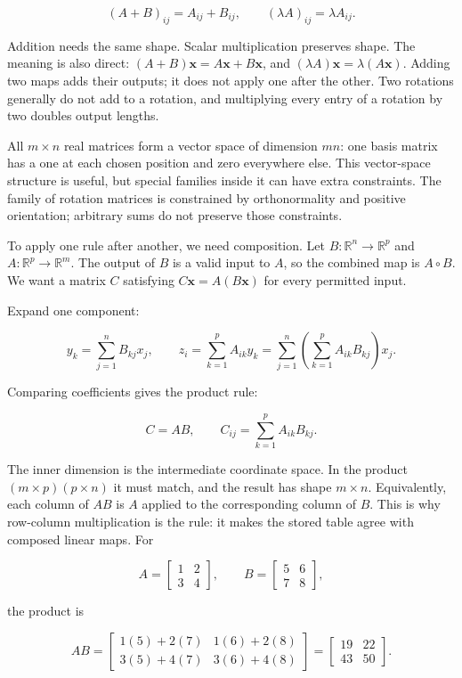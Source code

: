 \[
(A+B)_{ij}=A_{ij}+B_{ij},\qquad
(\lambda A)_{ij}=\lambda A_{ij}.
\]

Addition needs the same shape. Scalar multiplication preserves shape. The meaning is also direct: \((A+B)\mathbf x=A\mathbf x+B\mathbf x\), and \((\lambda A)\mathbf x=\lambda(A\mathbf x)\). Adding two maps adds their outputs; it does not apply one after the other. Two rotations generally do not add to a rotation, and multiplying every entry of a rotation by two doubles output lengths.

All \(m\times n\) real matrices form a vector space of dimension \(mn\): one basis matrix has a one at each chosen position and zero everywhere else. This vector-space structure is useful, but special families inside it can have extra constraints. The family of rotation matrices is constrained by orthonormality and positive orientation; arbitrary sums do not preserve those constraints.

To apply one rule after another, we need composition. Let \(B:\mathbb R^n\to\mathbb R^p\) and \(A:\mathbb R^p\to\mathbb R^m\). The output of \(B\) is a valid input to \(A\), so the combined map is \(A\circ B\). We want a matrix \(C\) satisfying \(C\mathbf x=A(B\mathbf x)\) for every permitted input.

Expand one component:

\[
y_k=\sum_{j=1}^{n}B_{kj}x_j,
\qquad
z_i=\sum_{k=1}^{p}A_{ik}y_k
=\sum_{j=1}^{n}\left(\sum_{k=1}^{p}A_{ik}B_{kj}\right)x_j.
\]

Comparing coefficients gives the product rule:

\[
C=AB,\qquad C_{ij}=\sum_{k=1}^{p}A_{ik}B_{kj}.
\]

The inner dimension is the intermediate coordinate space. In the product \((m\times p)(p\times n)\) it must match, and the result has shape \(m\times n\). Equivalently, each column of \(AB\) is \(A\) applied to the corresponding column of \(B\). This is why row-column multiplication is the rule: it makes the stored table agree with composed linear maps. For

\[
A=\begin{bmatrix}1&2\\3&4\end{bmatrix},\qquad
B=\begin{bmatrix}5&6\\7&8\end{bmatrix},
\]

the product is

\[
AB=\begin{bmatrix}1(5)+2(7)&1(6)+2(8)\\3(5)+4(7)&3(6)+4(8)\end{bmatrix}
=\begin{bmatrix}19&22\\43&50\end{bmatrix}.
\]

